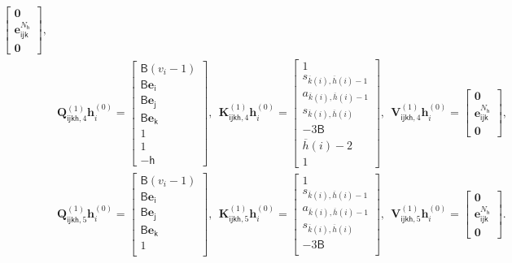 \documentclass[10pt]{article}
\renewcommand{\bar}{\overline}
\newcommand{\<}{\left\langle}
\renewcommand{\>}{\right\rangle}
\renewcommand{\bQ}{\mathbf{Q}}
\newcommand{\bzero}{{\mathbf 0}}
\newcommand{\state}{{s}}
\newcommand{\action}{{a}}
\newcommand{\tfthres}{{\mathsf{B}}}
\newcommand{\Numvi}{{N}}
\newcommand{\oddeven}{{v}}
\def\bK{{\mathbf K}}
\def\bQ{{\mathbf Q}}
\def\bV{{\mathbf V}}
\def\be{{\mathbf e}}
\def\bh{{\mathbf h}}
\def\si{{\mathsf{i}}}
\def\sj{{\mathsf{j}}}
\def\sk{{\mathsf{k}}}
\def\sh{{\mathsf{h}}}
\begin{document}
\begin{align*}
\begin{bmatrix}
\bzero\\\be^{\Numvi_\sh}_{\si\sj\sk}
\\\bzero\end{bmatrix},\\
&\bQ^{(1)}_{\si\sj\sk\sh,4}\bh^{(0)}_{i}=
\begin{bmatrix}
\tfthres(\oddeven_i-1)\\
        \tfthres\be_\si\\
         \tfthres\be_\sj\\
          \tfthres\be_\sk\\
          1\\
          1\\
         -\sh
    \end{bmatrix},~~ \bK^{(1)}_{\si\sj\sk\sh,4}\bh^{(0)}_{i}=\begin{bmatrix}1\\
     \state_{\bar{k}(i),\bar{h}(i)-1}\\
        \action_{\bar{k}(i),\bar{h}(i)-1}\\
         \state_{\bar{k}(i),\bar{h}(i)}\\
        -3\tfthres\\
      \bar{h}(i)-2\\
        1
\end{bmatrix},~~ \bV^{(1)}_{\si\sj\sk\sh,4}\bh^{(0)}_{i}=
\begin{bmatrix}
\bzero\\\be^{\Numvi_\sh}_{\si\sj\sk}
\\\bzero\end{bmatrix},\\
&\bQ^{(1)}_{\si\sj\sk\sh,5}\bh^{(0)}_{i}=
\begin{bmatrix}
\tfthres(\oddeven_i-1)\\
        \tfthres\be_\si\\
         \tfthres\be_\sj\\
          \tfthres\be_\sk\\
          1\\
    \end{bmatrix},~~ \bK^{(1)}_{\si\sj\sk\sh,5}\bh^{(0)}_{i}=\begin{bmatrix}1\\
     \state_{\bar{k}(i),\bar{h}(i)-1}\\
        \action_{\bar{k}(i),\bar{h}(i)-1}\\
         \state_{\bar{k}(i),\bar{h}(i)}\\
        -3\tfthres\\
\end{bmatrix},~~ \bV^{(1)}_{\si\sj\sk\sh,5}\bh^{(0)}_{i}=
\begin{bmatrix}
\bzero\\\be^{\Numvi_\sh}_{\si\sj\sk}
\\\bzero\end{bmatrix}.\\
\end{align*}
\end{document}
